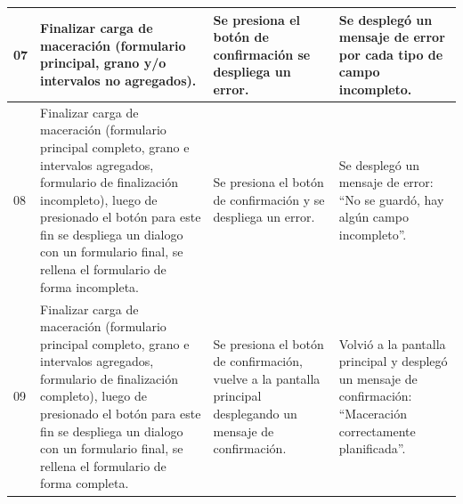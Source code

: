 \begin{longtable}{|p{0.6cm}|p{4cm}|p{4.7cm}|p{4.7cm}|}
    \hline
    07 & Finalizar carga de maceración (formulario principal, grano y/o intervalos no agregados). & Se presiona el botón de confirmación se despliega un error. & Se desplegó un mensaje de error por cada tipo de campo incompleto.\\
    \hline
    08 & Finalizar carga de maceración (formulario principal completo, grano e intervalos agregados, formulario de finalización incompleto), luego de presionado el botón para este fin se despliega un dialogo con un formulario final, se rellena el formulario de forma incompleta. & Se presiona el botón de confirmación y se despliega un error. & Se desplegó un mensaje de error: ``No se guardó, hay algún campo incompleto''.\\
    \hline
    09 & Finalizar carga de maceración (formulario principal completo, grano e intervalos agregados, formulario de finalización completo), luego de presionado el botón para este fin se despliega un dialogo con un formulario final, se rellena el formulario de forma completa. & Se presiona el botón de confirmación, vuelve a la pantalla principal desplegando un mensaje de confirmación. & Volvió a la pantalla principal y desplegó un mensaje de confirmación: ``Maceración correctamente planificada''.\\
    \hline

 \end{longtable}



